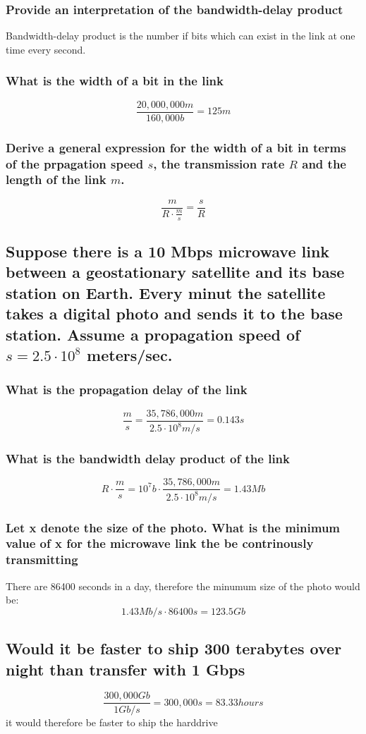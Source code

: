 \documentclass[12pt, a4paper]{article}
\begin{document}
			\subsubsection{Provide an interpretation of the bandwidth-delay product}
				Bandwidth-delay product is the number if bits which can exist in the link at one time every second.
			\subsubsection{What is the width of a bit in the link}
				$$\frac{20,000,000m}{160,000b}=125m$$
			\subsubsection{Derive a general expression for the width of a bit in terms of the prpagation speed $s$, the transmission rate $R$ and the length of the link $m$.}
				$$\frac{m}{R\cdot \frac{m}{s}}=\frac{s}{R}$$
		\subsection{Suppose there is a 10 Mbps microwave link between a geostationary satellite and its base station on Earth. Every minut the satellite takes a digital photo and sends it to the base station. Assume a propagation speed of $s=2.5\cdot 10^8$ meters/sec.}
			\subsubsection{What is the propagation delay of the link}
				$$\frac{m}{s}= \frac{35,786,000m}{2.5\cdot 10^8m/s}= 0.143s$$
			\subsubsection{What is the bandwidth delay product of the link}
				$$R\cdot \frac{m}{s}=10^7b\cdot \frac{35,786,000m}{2.5\cdot 10^8m/s}=1.43Mb$$
			\subsubsection{Let x denote the size of the photo. What is the minimum value of x for the microwave link the be contrinously transmitting}
				There are 86400 seconds in a day, therefore the minumum size of the photo would be:
				$$1.43Mb/s \cdot 86400s = 123.5Gb$$
		\subsection{Would it be faster to ship 300 terabytes over night than transfer with 1 Gbps}
			$$\frac{300,000Gb}{1Gb/s}=300,000s= 83.33 hours$$
			it would therefore be faster to ship the harddrive
			
\end{document}
